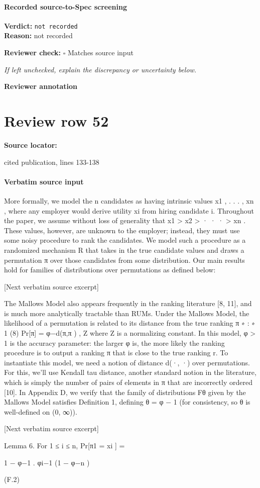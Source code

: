 \documentclass[10pt]{article}
\newcommand{\reviewerbox}{%
  \par\noindent\fbox{\parbox{0.96\linewidth}{\rule{0pt}{0.38in}}}\par
}
\newcommand{\reviewmatch}[1]{%
  \par\noindent\textbf{Reviewer check:} $\square$\; #1\par
  \noindent\emph{If left unchecked, explain the discrepancy or uncertainty below.}\par
}
\begin{document}
\paragraph{Recorded source-to-Spec screening}
\textbf{Verdict:} \texttt{not recorded}
\\
\textbf{Reason:} not recorded
\reviewmatch{Matches source input}
\noindent\textbf{Reviewer annotation}\par
\reviewerbox
\clearpage
\hypertarget{source-claim-4e3a949fd1ab09f3}{}
\section*{Review row 52}
\textbf{Source locator:} {\footnotesize\raggedright cited publication, lines 133-\allowbreak{}138\par}
\paragraph{Verbatim source input}
\begin{ReviewVerbatim}
More formally, we model the n candidates as having intrinsic values x1 , . . . , xn , where any employer would
derive utility xi from hiring candidate i. Throughout the paper, we assume without loss of generality that
x1 > x2 > · · · > xn . These values, however, are unknown to the employer; instead, they must use some
noisy procedure to rank the candidates. We model such a procedure as a randomized mechanism R that
takes in the true candidate values and draws a permutation π over those candidates from some distribution.
Our main results hold for families of distributions over permutations as defined below:

[Next verbatim source excerpt]

The Mallows Model also appears frequently in the ranking literature [8, 11], and is much more analytically
tractable than RUMs. Under the Mallows Model, the likelihood of a permutation is related to its distance
from the true ranking π ∗ :
∗
1
(8)
Pr[π] = φ−d(π,π ) ,
Z
where Z is a normalizing constant. In this model, φ > 1 is the accuracy parameter: the larger φ is, the
more likely the ranking procedure is to output a ranking π that is close to the true ranking r. To instantiate
this model, we need a notion of distance d(·, ·) over permutations. For this, we’ll use Kendall tau distance,
another standard notion in the literature, which is simply the number of pairs of elements in π that are
incorrectly ordered [10]. In Appendix D, we verify that the family of distributions Fθ given by the Mallows
Model satisfies Definition 1, defining θ = φ − 1 (for consistency, so θ is well-defined on (0, ∞)).

[Next verbatim source excerpt]

Lemma 6. For 1 ≤ i ≤ n,
Pr[π1 = xi ] =

1 − φ−1
.
φi−1 (1 − φ−n )

(F.2)
\end{ReviewVerbatim}
\end{document}
